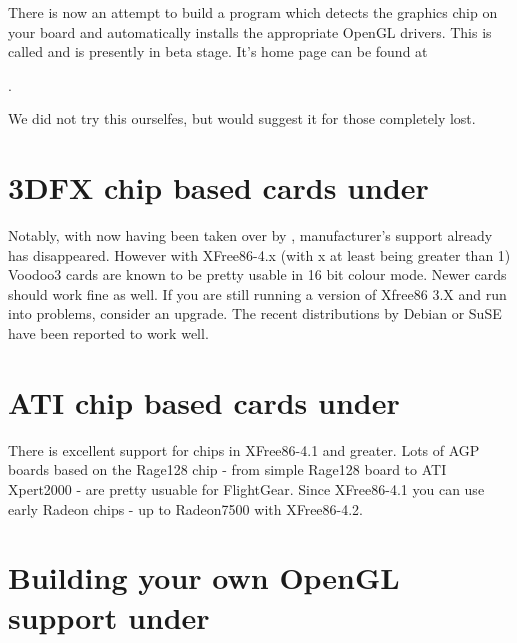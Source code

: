 There is now an attempt to build a program which detects the graphics chip on your board
and automatically installs the appropriate OpenGL drivers. This is called  and is presently in beta stage. It's home page can be found at
\medskip

.
\medskip

We did not try this ourselfes, but would suggest it for those completely lost.

\section{3DFX chip based cards under \label{3dfxlinux}}

Notably, with  now having been taken over by , manufacturer's
support already has disappeared. However with XFree86-4.x (with x at least being greater
than 1) Voodoo3 cards are known to be pretty usable in 16 bit colour mode. Newer cards
should work fine as well. If you are still running a version of Xfree86 3.X and run into
problems, consider an upgrade. The recent distributions by Debian or SuSE have been
reported to work well.

\section{ATI chip based cards under \label{atilinux}}

There is excellent support for  chips in XFree86-4.1 and greater. Lots of
AGP boards based on the Rage128 chip - from simple Rage128 board to ATI
Xpert2000 - are pretty usuable for FlightGear. Since XFree86-4.1 you can use
early Radeon chips - up to Radeon7500 with XFree86-4.2.

\section{Building your own OpenGL support under \label{ownopengl}}

